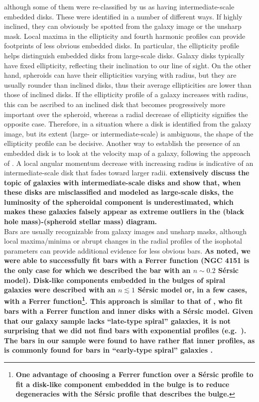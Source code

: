 \documentclass[preprint2]{emulateapj}
\begin{document}
although some of them were re-classified by us as having intermediate-scale embedded disks.
These were identified in a number of different ways. 
If highly inclined, they can obviously be spotted from the galaxy image or the unsharp mask.
Local maxima in the ellipticity and fourth harmonic profiles 
can provide footprints of less obvious embedded disks.
In particular, the ellipticity profile helps distinguish embedded disks from large-scale disks.
Galaxy disks typically have fixed ellipticity, reflecting their inclination to our line of sight.
On the other hand, spheroids can have their ellipticities varying with radius,
but they are usually rounder than inclined disks, thus their average ellipticities are lower than those of inclined disks.
If the ellipticity profile of a galaxy increases with radius, 
this can be ascribed to an inclined disk that becomes progressively more important over the spheroid,
whereas a radial decrease of ellipticity signifies the opposite case.
Therefore, in a situation where a disk is identified from the galaxy image, 
but its extent (large- or intermediate-scale) is ambiguous,
the shape of the ellipticity profile can be decisive. 
Another way to establish the presence of an embedded disk is to look at the velocity map of a galaxy,
following the approach of \citet{arnold2014}. 
A local angular momentum decrease with increasing radius is indicative of an intermediate-scale disk 
that fades toward larger radii. 
{\bf \cite{savorgnangraham2015ellicular} extensively discuss the topic of galaxies with intermediate-scale disks 
and show that, when these disks are misclassified and modeled as large-scale disks, 
the luminosity of the spheroidal component is underestimated, 
which makes these galaxies falsely appear as extreme outliers in the (black hole mass)-(spheroid stellar mass) diagram. } \\
Bars are usually recognizable from galaxy images and unsharp masks, 
although local maxima/minima or abrupt changes in the radial profiles of the isophotal parameters 
can provide additional evidence for less obvious bars. 
{\bf As noted, we were able to successfully fit bars with a Ferrer function 
(NGC 4151 is the only case for which we described the bar with an $n \sim 0.2$ S\'ersic model). 
Disk-like components embedded in the bulges of spiral galaxies were described with an $n \lesssim 1$ S\'ersic model or, 
in a few cases, with a Ferrer function\footnote{\bf One advantage of choosing a Ferrer function over a S\'ersic profile 
to fit a disk-like component embedded in the bulge 
is to reduce degeneracies with the S\'ersic profile that describes the bulge.}. 
This approach is similar to that of \cite{laurikainen2010}, 
who fit bars with a Ferrer function and inner disks with a S\'ersic model. 
Given that our galaxy sample lacks ``late-type spiral'' galaxies, 
it is not surprising \citep{gadottidesouza2006} that we did not find bars with exponential profiles 
(e.g.~\citealt{elmegreenelmegreen1985,gadotti2008,kim2015}).
The bars in our sample were found to have rather flat inner profiles, 
as is commonly found for bars in ``early-type spiral'' galaxies \citep{gadottidesouza2006}. } \\
\end{document}
